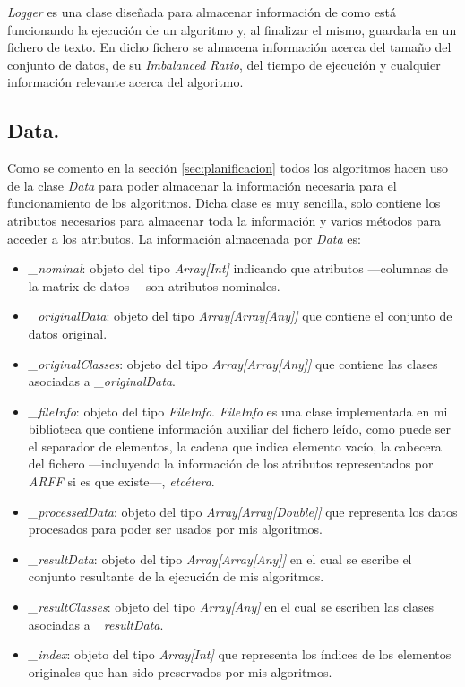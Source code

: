 \textit{Logger} es una clase diseñada para almacenar información de como está funcionando la ejecución de un algoritmo y, al finalizar el mismo, guardarla en un fichero de texto. En dicho fichero se almacena información acerca del tamaño del conjunto de datos, de su \textit{Imbalanced Ratio}, del tiempo de ejecución y cualquier información relevante acerca del algoritmo.

\subsection{Data.} \label{sec:data}

Como se comento en la sección \ref{sec:planificacion} todos los algoritmos hacen uso de la clase \textit{Data} para poder almacenar la información necesaria para el funcionamiento de los algoritmos. Dicha clase es muy sencilla, solo contiene los atributos necesarios para almacenar toda la información y varios métodos para acceder a los atributos. La información almacenada por \textit{Data} es:

\begin{itemize}
    \item \textit{\_nominal}: objeto del tipo \textit{Array[Int]} indicando que atributos —columnas de la matrix de datos— son atributos nominales.
    \item \textit{\_originalData}: objeto del tipo \textit{Array[Array[Any]]} que contiene el conjunto de datos original.
    \item \textit{\_originalClasses}: objeto del tipo \textit{Array[Array[Any]]} que contiene las clases asociadas a \textit{\_originalData}.
    \item \textit{\_fileInfo}: objeto del tipo \textit{FileInfo}. \textit{FileInfo} es una clase implementada en mi biblioteca que contiene información auxiliar del fichero leído, como puede ser el separador de elementos, la cadena que indica elemento vacío, la cabecera del fichero —incluyendo la información de los atributos representados por \textit{ARFF} \cite{arffwiki} si es que existe—, \textit{etcétera}.
    \item \textit{\_processedData}: objeto del tipo \textit{Array[Array[Double]]} que representa los datos procesados para poder ser usados por mis algoritmos.
    \item \textit{\_resultData}: objeto del tipo \textit{Array[Array[Any]]} en el cual se escribe el conjunto resultante de la ejecución de mis algoritmos.
    \item \textit{\_resultClasses}: objeto del tipo \textit{Array[Any]} en el cual se escriben las clases asociadas a \textit{\_resultData}.
    \item \textit{\_index}: objeto del tipo \textit{Array[Int]} que representa los índices de los elementos originales que han sido preservados por mis algoritmos. 
\end{itemize}

